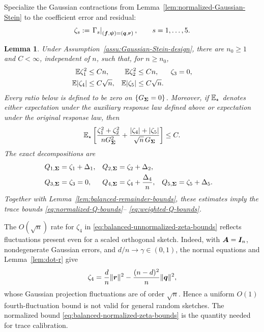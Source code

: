 \documentclass{article}
\theoremstyle{plain} %
\newtheorem{lemma}[theorem]{Lemma}
\theoremstyle{definition} %
\theoremstyle{definition} %
\begin{document}
Specialize the Gaussian contractions from
Lemma~\ref{lem:normalized-Gaussian-Stein} to the coefficient error and residual:
\begin{equation}
    \zeta_s:=\left.\Gamma_s\right|_{(\boldsymbol{f},\boldsymbol\psi)=(\boldsymbol{q},\boldsymbol{r})},
    \qquad s=1,\ldots,5.
    \label{eq:zeta-definitions}
\end{equation}

\begin{lemma}
\label{lem:balanced-trace-Stein-bounds}
Under Assumption~\ref{assu:Gaussian-Stein-design},
there are $n_0\geq1$ and $C<\infty$, independent of $n$, such that, for
$n\geq n_0$,
\begin{align}
    {\mathbb{E}}\zeta_1^2&\leq Cn,
    & {\mathbb{E}}\zeta_2^2&\leq Cn,
    & \zeta_3&=0,\notag\\
    {\mathbb{E}}|\zeta_4|&\leq C\sqrt n,
    & {\mathbb{E}}|\zeta_5|&\leq C\sqrt n.
    \label{eq:balanced-unnormalized-zeta-bounds}
\end{align}
Every ratio below is defined to be zero on $\{G_{\boldsymbol{\Sigma}}=0\}$.
Moreover, if ${\mathbb{E}}_\star$ denotes either expectation under the auxiliary
response law defined above
or expectation under
the original response law, then
\begin{align}
    {\mathbb{E}}_\star\left[
       \frac{\zeta_1^2+\zeta_2^2}
            {nG_{\boldsymbol{\Sigma}}^2}
       +\frac{|\zeta_4|+|\zeta_5|}
            {\sqrt n\,G_{\boldsymbol{\Sigma}}}
    \right]\leq C.
    \label{eq:balanced-normalized-zeta-bounds}
\end{align}
The exact decompositions are
\begin{align}
    Q_{1,\boldsymbol{\Sigma}}&=\zeta_1+\Delta_1,
    & Q_{2,\boldsymbol{\Sigma}}&=\zeta_2+\Delta_2,\notag\\
    Q_{3,\boldsymbol{\Sigma}}&=\zeta_3=0,
    & Q_{4,\boldsymbol{\Sigma}}&=\zeta_4+\frac{\Delta_4}{n},
    & Q_{5,\boldsymbol{\Sigma}}&=\zeta_5+\Delta_5.
    \label{eq:balanced-Q-zeta-Delta}
\end{align}
Together with Lemma~\ref{lem:balanced-remainder-bounds}, these estimates imply
the trace bounds \eqref{eq:normalized-Q-bounds}--
\eqref{eq:weighted-Q-bounds}.
\end{lemma}

The $O(\sqrt n)$ rate for $\zeta_4$ in
\eqref{eq:balanced-unnormalized-zeta-bounds} reflects fluctuations present
even for a scaled orthogonal sketch. Indeed, with $\boldsymbol{A}=\boldsymbol{I}_n$, nondegenerate
Gaussian errors, and $d/n\to\gamma\in(0,1)$, the normal equations and
Lemma~\ref{lem:dot-r} give
\begin{align*}
    \zeta_4
    =\frac dn\lVert\boldsymbol{r}\rVert^2-\frac{(n-d)^2}{n}\lVert\boldsymbol{q}\rVert^2,
\end{align*}
whose Gaussian projection fluctuations are of order $\sqrt n$.  Hence a
uniform $O(1)$ fourth-fluctuation bound is not valid for general random
sketches.  The normalized bound
\eqref{eq:balanced-normalized-zeta-bounds} is the quantity needed for trace
calibration.
\end{document}
